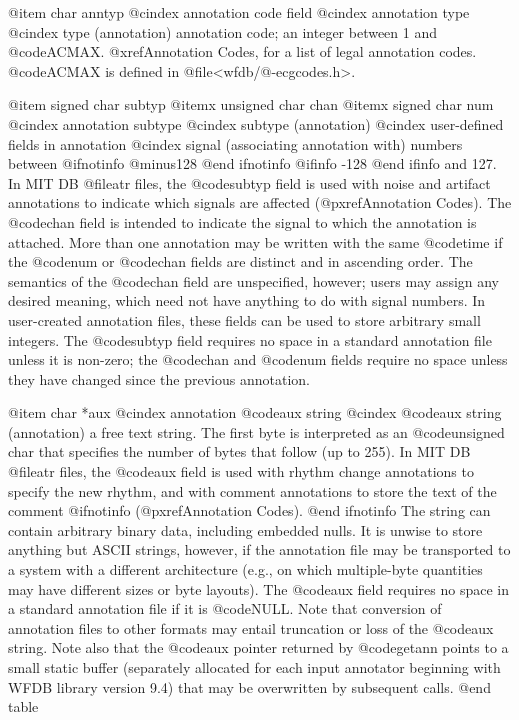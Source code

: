 {{{{{{{{{@item char anntyp
@cindex annotation code field
@cindex annotation type
@cindex type (annotation)
annotation code; an integer between 1 and @code{ACMAX}.
@xref{Annotation Codes}, for a list of legal annotation codes.
@code{ACMAX} is defined in @file{<wfdb/@-ecgcodes.h>}.

@item signed char subtyp
@itemx unsigned char chan
@itemx signed char num
@cindex annotation subtype
@cindex subtype (annotation)
@cindex user-defined fields in annotation
@cindex signal (associating annotation with)
numbers between
@ifnotinfo
@minus{}128
@end ifnotinfo
@ifinfo
-128
@end ifinfo
and 127.  In MIT DB @file{atr} files, the
@code{subtyp} field is used with noise and artifact annotations to
indicate which signals are affected (@pxref{Annotation Codes}).
The @code{chan} field is intended to indicate the signal to which the
annotation is attached.  More than one annotation may be written with
the same @code{time} if the @code{num} or @code{chan} fields are distinct and in
ascending order.  The semantics of the @code{chan} field are
unspecified, however; users may assign any desired meaning, which need
not have anything to do with signal numbers.  In user-created annotation
files, these fields can be used to store arbitrary small integers.  The
@code{subtyp} field requires no space in a standard annotation file
unless it is non-zero; the @code{chan} and @code{num} fields require no
space unless they have changed since the previous annotation.

@item char *aux
@cindex annotation @code{aux} string
@cindex @code{aux} string (annotation)
a free text string.  The first byte is interpreted as an @code{unsigned
char} that specifies the number of bytes that follow (up to 255).  In
MIT DB @file{atr} files, the @code{aux} field is used with rhythm
change annotations to specify the new rhythm, and with comment
annotations to store the text of the comment
@ifnotinfo
(@pxref{Annotation Codes}).
@end ifnotinfo
The string can contain arbitrary binary
data, including embedded nulls.  It is unwise to store anything but ASCII
strings, however, if the annotation file may be transported to a system with
a different architecture (e.g., on which multiple-byte quantities may have
different sizes or byte layouts).  The @code{aux} field requires no
space in a standard annotation file if it is @code{NULL}.  Note that
conversion of annotation files to other formats may entail truncation or
loss of the @code{aux} string.  Note also that the @code{aux} pointer
returned by @code{getann} points to a small static buffer (separately
allocated for each input annotator beginning with WFDB library version
9.4) that may be overwritten by subsequent calls.
@end table

}}}}}}}}}
